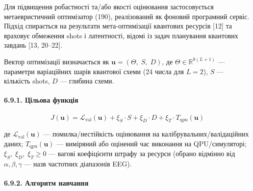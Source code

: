 \documentclass[12pt,a4paper]{article}
\begin{document}
Для підвищення робастності та/або якості оцінювання застосовується метаевристичний оптимізатор (190), реалізований як фоновий програмний сервіс. Підхід спирається на результати мета-оптимізації квантових ресурсів {[}12{]} та враховує обмеження shots і латентності, відомі із задач планування квантових завдань {[}13, 20--22{]}.



Вектор оптимізації визначається як \(\mathbf{u} = (\Theta,\;S,\;D)\), де \(\Theta \in \mathbb{R}^{8(L+1)}\) --- параметри варіаційних шарів квантової схеми (24 числа для \(L = 2\)), \(S\) --- кількість shots, \(D\) --- глибина схеми.



\paragraph{6.9.1. Цільова функція}\label{ux446ux456ux43bux44cux43eux432ux430-ux444ux443ux43dux43aux446ux456ux44f}



\[\boxed{\;J(\mathbf{u}) = \mathcal{L}_{\text{val}}(\mathbf{u}) + \xi_S \cdot S + \xi_D \cdot D + \xi_T \cdot T_{\text{qpu}}(\mathbf{u})\;}\]



де \(\mathcal{L}_{\text{val}}(\mathbf{u})\) --- помилка/нестійкість оцінювання на калібрувальних/валідаційних даних; \(T_{\text{qpu}}(\mathbf{u})\) --- виміряний або оцінений час виконання на QPU/симуляторі; \(\xi_S,\;\xi_D,\;\xi_T \geq 0\) --- вагові коефіцієнти штрафу за ресурси (обрано відмінно від \(\alpha,\beta,\gamma\) --- назв частотних діапазонів EEG).



\paragraph{6.9.2. Алгоритм навчання}\label{ux430ux43bux433ux43eux440ux438ux442ux43c-ux43dux430ux432ux447ux430ux43dux43dux44f}
\end{document}
